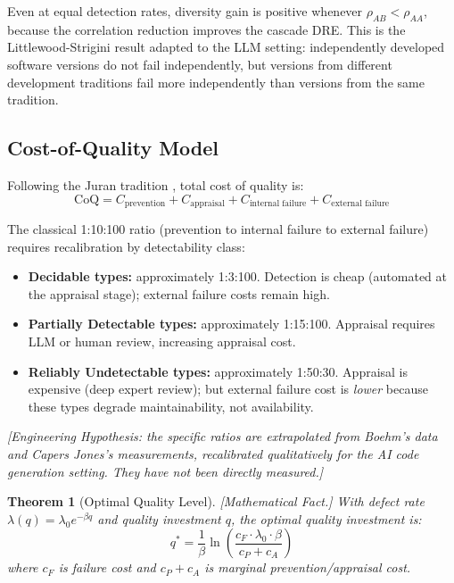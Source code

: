 \documentclass[11pt, a4paper, logo, copyright]{googledeepmind}
\newtheorem{theorem}{Theorem}[section]
\begin{document}
Even at equal detection rates, diversity gain is positive whenever $\rho_{AB} < \rho_{AA}$, because the correlation reduction improves the cascade DRE. This is the Littlewood-Strigini result \citep{littlewood1993, littlewood2000} adapted to the LLM setting: independently developed software versions do not fail independently, but versions from different development traditions fail more independently than versions from the same tradition.

\subsection{Cost-of-Quality Model}

Following the Juran tradition \citep{juran1999}, total cost of quality is:
\begin{equation}
    \text{CoQ} = C_{\text{prevention}} + C_{\text{appraisal}} + C_{\text{internal failure}} + C_{\text{external failure}}
\end{equation}

The classical 1:10:100 ratio (prevention to internal failure to external failure) \citep{boehm1981} requires recalibration by detectability class:

\begin{itemize}[nosep]
\item \textbf{Decidable types:} approximately 1:3:100. Detection is cheap (automated at the appraisal stage); external failure costs remain high.
\item \textbf{Partially Detectable types:} approximately 1:15:100. Appraisal requires LLM or human review, increasing appraisal cost.
\item \textbf{Reliably Undetectable types:} approximately 1:50:30. Appraisal is expensive (deep expert review); but external failure cost is \emph{lower} because these types degrade maintainability, not availability.
\end{itemize}

\emph{[Engineering Hypothesis: the specific ratios are extrapolated from Boehm's data and Capers Jones's measurements, recalibrated qualitatively for the AI code generation setting. They have not been directly measured.]}

\begin{theorem}[Optimal Quality Level]
\label{thm:optquality}
\emph{[Mathematical Fact.]} With defect rate $\lambda(q) = \lambda_0 e^{-\beta q}$ and quality investment $q$, the optimal quality investment is:
\begin{equation}
q^* = \frac{1}{\beta} \ln\!\left(\frac{c_F \cdot \lambda_0 \cdot \beta}{c_P + c_A}\right)
\end{equation}
where $c_F$ is failure cost and $c_P + c_A$ is marginal prevention/appraisal cost.
\end{theorem}
\end{document}
